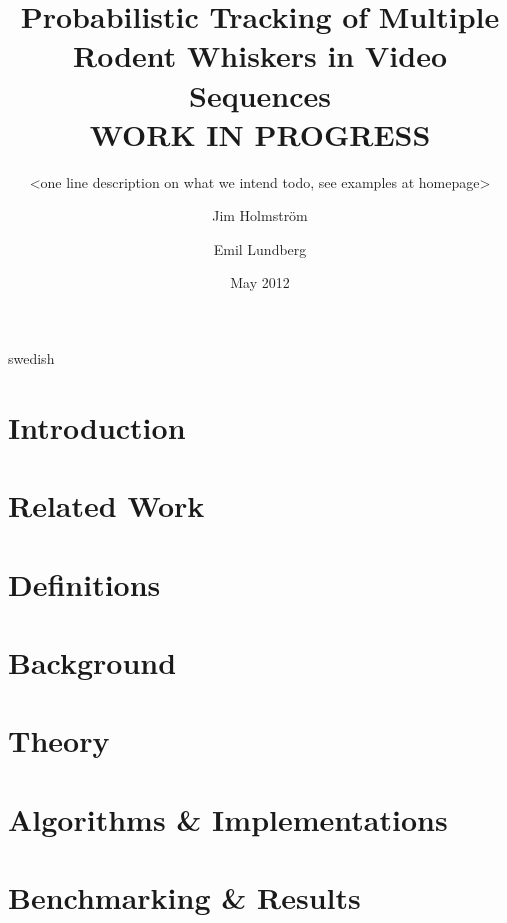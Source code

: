 \documentclass[a4paper,11pt]{kth-mag}
\title{
    Probabilistic Tracking of Multiple Rodent Whiskers in Video Sequences
    \\WORK IN PROGRESS
}
\subtitle{
    <one line description on what we intend todo, see examples at homepage> 
}
\author{
    Jim Holmström \and
    Emil Lundberg
}
\date{May 2012}
\begin{document}
\frontmatter
\pagestyle{empty}
\removepagenumbers
\maketitle
{}
\begin{abstract}
    
\end{abstract}
\clearpage
\begin{foreignabstract}{swedish}
    
\end{foreignabstract}
\clearpage
\tableofcontents*
\mainmatter
\pagestyle{newchap}
\chapter{Introduction}
    \label{sec:introduction}
    

\chapter{Related Work}
    \label{sec:related_work}
    

\chapter{Definitions}
    \label{sec:definitions}
    

\chapter{Background}
    \label{sec:Background}
    

\chapter{Theory}
    \label{sec:theory}
    


\chapter{Algorithms \& Implementations}
    \label{sec:algorithms_implementations}
    


\chapter{Benchmarking \& Results}
    \label{sec:benchmarks_results}
    
\end{document}
